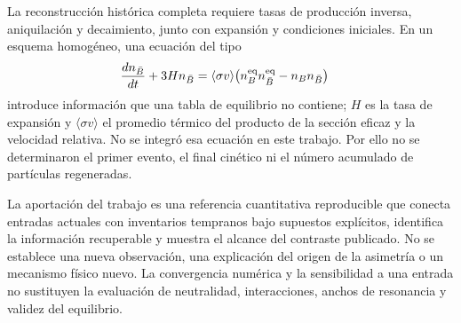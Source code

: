 La reconstrucción histórica completa requiere tasas de producción inversa, aniquilación y decaimiento, junto con expansión y condiciones iniciales. En un esquema homogéneo, una ecuación del tipo
\begin{align}
\frac{dn_{\bar B}}{dt}+3Hn_{\bar B}
&=\langle\sigma v\rangle\bigl(n_B^{\rm eq}n_{\bar B}^{\rm eq}
-n_Bn_{\bar B}\bigr)\label{eq:kinetic}
\end{align}
introduce información que una tabla de equilibrio no contiene; $H$ es la tasa de expansión y $\langle\sigma v\rangle$ el promedio térmico del producto de la sección eficaz y la velocidad relativa. No se integró esa ecuación en este trabajo. Por ello no se determinaron el primer evento, el final cinético ni el número acumulado de partículas regeneradas.

La aportación del trabajo es una referencia cuantitativa reproducible que conecta entradas actuales con inventarios tempranos bajo supuestos explícitos, identifica la información recuperable y muestra el alcance del contraste publicado. No se establece una nueva observación, una explicación del origen de la asimetría o un mecanismo físico nuevo. La convergencia numérica y la sensibilidad a una entrada no sustituyen la evaluación de neutralidad, interacciones, anchos de resonancia y validez del equilibrio.
